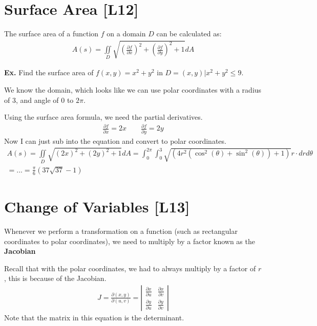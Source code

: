 \documentclass[12pt,letterpaper]{article} \usepackage{amsmath} \usepackage{graphicx} \usepackage[margin=1in]{geometry} \usepackage{longtable}  \usepackage{amssymb}
\begin{document}
	
	\section{Surface Area [L12]}
	The surface area of a function $f$ on a domain $D$ 	can be calculated as:
	\begin{align*}
		A(s) =  \iint\limits_D \sqrt{\left(\frac{\partial f}{\partial x} \right)^2 + \left(\frac{\partial f}{\partial y}\right)^2 + 1} dA
	\end{align*}

	\begin{mdframed}[]
	\textbf{Ex. } Find the surface area of $f(x,y)=x^2+y^2$ in $D={(x,y) | x^2+y^2\le 9}$.
	
	We know the domain, which looks like we can use polar coordinates with a radius of 3, and angle of 0 to $2\pi$. 
	
	Using the surface area formula, we need the partial derivatives. 
	\begin{align*}
		\frac{\partial f}{\partial x} = 2x \qquad \frac{\partial f}{\partial y} = 2y
	\end{align*}	
	Now I can just sub into the equation and convert to polar coordinates. 
	\begin{align*}
		A(s) = \iint \limits_D \sqrt{(2x)^2 + (2y)^2 + 1} dA = \int_0^{2\pi} \int^3_0 \sqrt{\left(4r^2\left(\cos^2 (\theta) + \sin^2(\theta)\right)+1\right)}r \cdot drd\theta \\= ...=\frac{\pi}{6} (37\sqrt{37}-1)
	\end{align*}
	
	\end{mdframed}

	\section{Change of Variables [L13]}
	Whenever we perform a transformation on a function (such as rectangular coordinates to polar coordinates), we need to multiply by a factor known as the \textbf{Jacobian}
	
	Recall that with the polar coordinates, we had to always multiply by a factor of $r$, this is because of the Jacobian.
	\begin{align*}
		J = \frac{\partial (x,y) }{\partial (u,v)} = \left|\begin{array}{cc} \frac{\partial x}{\partial u} & \frac{\partial x}{\partial v} \\ \frac{\partial y}{\partial u} & \frac{\partial y}{\partial v} \end{array}\right|
	\end{align*}
	Note that the matrix in this equation is the determinant.
	
\end{document}

